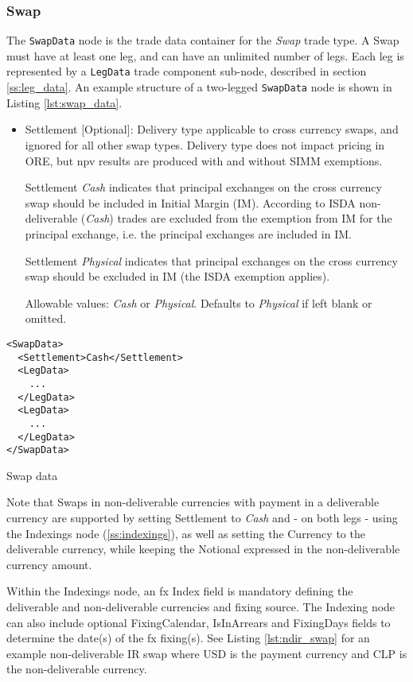 \subsubsection{Swap}

The \lstinline!SwapData! node is the trade data container for the \emph{Swap} trade type. A Swap must have at least one leg,
and can have an unlimited number of legs. Each leg is represented by a \lstinline!LegData! trade component sub-node,
described in section \ref{ss:leg_data}. An example structure of a two-legged \lstinline!SwapData!
node is shown in Listing \ref{lst:swap_data}.
\begin{itemize}
\item Settlement [Optional]: Delivery type applicable to cross currency swaps, and ignored for all other swap types. Delivery type does not impact pricing in ORE, but npv results are produced with and without SIMM exemptions.  

Settlement \emph{Cash} indicates that principal exchanges on the cross currency swap should be included in Initial Margin (IM). According to ISDA non-deliverable (\emph{Cash}) trades are excluded from the exemption from IM for the principal exchange, i.e. the principal exchanges are included in IM. 

Settlement \emph{Physical} indicates that principal exchanges on the cross currency swap should be excluded in IM (the ISDA exemption applies).  

Allowable values: \emph{Cash} or \emph{Physical}.  Defaults to \emph{Physical} if left blank or omitted.
\end{itemize}

\begin{listing}[H]
\begin{verbatim}
<SwapData>
  <Settlement>Cash</Settlement>
  <LegData>
    ...
  </LegData>
  <LegData>
    ...
  </LegData>
</SwapData>
\end{verbatim}
\caption{Swap data}
\label{lst:swap_data}
\end{listing}


Note that Swaps in non-deliverable currencies with payment in a deliverable currency are supported by setting Settlement  to \emph{Cash} and - on both legs - using the Indexings node (\ref{ss:indexings}), as well as setting the Currency to the deliverable currency, while keeping the Notional expressed in the non-deliverable currency amount. 

Within the  Indexings node,  an fx Index field is mandatory defining the deliverable and non-deliverable currencies and fixing source. The Indexing node can also include optional FixingCalendar, IsInArrears and FixingDays fields to determine the date(s) of the fx fixing(s). See Listing \ref{lst:ndir_swap} for an example non-deliverable IR swap where USD is the payment currency and CLP is the non-deliverable currency.


